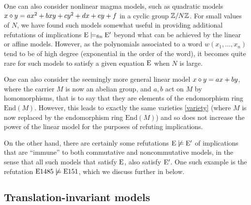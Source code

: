\begin{remark}  One can also consider nonlinear magma models, such as quadratic models $x \diamond y = ax^2 + bxy + cy^2 + dx + ey + f$ in a cyclic group $\mathbb{Z}/N\mathbb{Z}$.  For small values of $N$, we have found such models somewhat useful in providing additional refutations of implications $\mathrm{E} \models_{\mathrm{fin}} {\mathrm{E}'}$ beyond what can be achieved by the linear or affine models.  However, as the polynomials associated to a word $w(x_1,\dots,x_n)$ tend to be of high degree (exponential in the order of the word), it becomes quite rare for such models to satisfy a given equation $\mathrm{E}$ when $N$ is large.
\end{remark}

\begin{remark} One can also consider the seemingly more general linear model $x \diamond y = ax + by$, where the carrier $M$ is now an abelian group, and $a,b$ act on $M$ by homomorphisms, that is to say that they are elements of the endomorphism ring $\mathrm{End}(M)$.  However, this leads to exactly the same varieties \eqref{variety} (where $M$ is now replaced by the endomorphism ring $\mathrm{End}(M)$) and so does not increase the power of the linear model for the purposes of refuting implications.
\end{remark}

On the other hand, there are certainly some refutations $\mathrm{E} \not\models {\mathrm{E}'}$ of implications that are ``immune'' to both commutative and noncommutative models, in the sense that all such models that satisfy $\mathrm{E}$, also satisfy ${\mathrm{E}'}$.  One such example is the refutation $\mathrm{E}1485 \not \models \mathrm{E}151$, which we discuss further in  below.

\subsection{Translation-invariant models}\label{translation-sec}


